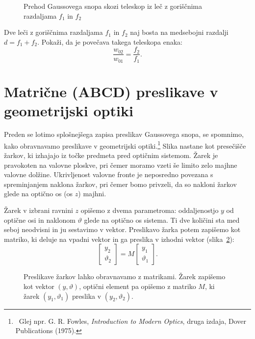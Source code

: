 \begin{figure}[ht]
\def\svgwidth{128truemm} 

\caption{Prehod Gaussovega snopa
skozi teleskop iz leč z goriščnima razdaljama $f_{1}$ in $f_{2}$}
\label{fig:Prehod-Gaussovega-snopa-teleskop}
\end{figure}

\begin{naloga}
\label{teleskop}
Dve leči z goriščnima razdaljama $f_{1}$ in $f_{2}$ naj bosta na medsebojni
razdalji $d=f_{1}+f_{2}$. Pokaži, da je povečava takega teleskopa enaka: 
\begin{equation}
\frac{w_{02}}{w_{01}}=\frac{f_{2}}{f_{1}}.
\label{eq:povecava-teleskop}
\end{equation}
\end{naloga}

\section{Matrične (ABCD) preslikave v geometrijski optiki}
\label{chap:ABCDgeo}
Preden se lotimo splošnejšega zapisa preslikav Gaussovega snopa, 
se spomnimo, kako obravnavamo preslikave v geometrijski 
optiki.\footnote{~Glej npr. G. R. Fowles, {\it Introduction to Modern Optics}, 
druga izdaja, Dover Publications (1975).}
Slika nastane kot presečišče žarkov,
ki izhajajo iz točke predmeta pred optičnim sistemom. Žarek 
je pravokoten na valovne ploskve, pri čemer moramo vzeti še limito zelo majhne
valovne dolžine. Ukrivljenost valovne fronte je neposredno
povezana s spreminjanjem naklona žarkov, pri čemer bomo privzeli, da so 
nakloni žarkov glede na optično os (os $z$) majhni.

Žarek v izbrani ravnini $z$ opišemo z dvema parametroma: 
oddaljenostjo $y$ od optične osi in naklonom $\vartheta$ glede na optično os sistema. 
Ti dve količini sta med seboj neodvisni in ju sestavimo v vektor.
Preslikavo žarka potem zapišemo kot matriko, ki deluje na vpadni vektor in ga preslika
v izhodni vektor (slika~\ref{fig:K-matricni-obravnavi}):
\begin{equation}
\left[\begin{array}{c}
y_2\\
\vartheta_2
\end{array}\right] = M \left[\begin{array}{c}
y_1\\
\vartheta_1
\end{array}\right]\!\!.
\end{equation}
\begin{figure}[ht]
\centering
\centering
\def\svgwidth{110truemm}

\caption{Preslikave žarkov lahko obravnavamo
z matrikami. Žarek zapišemo kot vektor $(y,\vartheta)$, optični element pa opišemo z matriko $M$, 
ki žarek $(y_{1},\vartheta_{1})$ preslika v $(y_{2},\vartheta_{2})$.}
\label{fig:K-matricni-obravnavi}
\end{figure}

